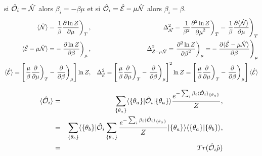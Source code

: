 	si $\hat{\mathbf{\mathcal{O}}}_i = \hat{\mathbf{\mathcal{N}}}$ alors $\beta_i = - \beta \mu $ et si $\hat{\mathbf{\mathcal{O}}}_i = \hat{\mathbf{\mathcal{E}}} - \mu \hat{\mathbf{\mathcal{N}}} $ alors $\beta_i = \beta$.\\
	
	\begin{eqnarray}
		\langle \hat{\mathbf{\mathcal{N}}} \rangle  = \left .\frac{1}{\beta} \frac{ \partial \ln Z}{\partial \mu } \right )_T,  & & \Delta^2_{\hat{\mathbf{\mathcal{N}}}} = \left . \frac{1}{\beta^2} \frac{ \partial^2 \ln Z}{{\partial \mu}^2 } \right )_T =  \left . \frac{1}{\beta} \frac{ \partial \langle \hat{\mathbf{\mathcal{N}}} \rangle}{\partial \mu } \right )_T\\
		\langle \hat{\mathbf{\mathcal{E}}} - \mu\hat{\mathbf{\mathcal{N}}}  \rangle  = -\left . \frac{ \partial \ln Z}{\partial \beta } \right )_\mu,  & & \Delta^2_{\hat{\mathbf{\mathcal{E}}} - \mu\hat{\mathbf{\mathcal{N}}}} = \left .  \frac{ \partial^2 \ln Z}{{\partial \beta}^2 } \right )_\mu =  -\left .  \frac{ \partial \langle \hat{\mathbf{\mathcal{E}}} - \mu\hat{\mathbf{\mathcal{N}}} \rangle}{\partial \beta } \right )_\mu	\\
		\langle \hat{\mathbf{\mathcal{E}}} \rangle  = \left [ \left .\frac{\mu}{\beta} \frac{ \partial}{\partial \mu } \right )_T -\left . \frac{ \partial }{\partial \beta } \right )_\mu  \right ]\ln Z,  & & \Delta^2_{\hat{\mathbf{\mathcal{E}}} } = \left [ \left .\frac{\mu}{\beta} \frac{ \partial}{\partial \mu } \right )_T -\left . \frac{ \partial }{\partial \beta } \right )_\mu  \right ]^2\ln Z=  \left [ \left .\frac{\mu}{\beta} \frac{ \partial}{\partial \mu } \right )_T -\left . \frac{ \partial }{\partial \beta } \right )_\mu  \right ]\langle \hat{\mathbf{\mathcal{E}}} \rangle	
	\end{eqnarray}

	
	\begin{eqnarray}
		\langle\hat{\mathbf{\mathcal{O}}}_i \rangle & = & 	\sum_{\{\theta_a \} } 	\langle \{\theta_a \}  \vert \hat{\mathbf{\mathcal{O}}}_i \vert \{\theta_a \}  \rangle \frac{e^{-\sum_i \beta_i \langle \hat{\mathbf{\mathcal{O}}}_i \rangle_{\{\theta_a \}} }}{Z},\\
		& = & 	\sum_{\{\theta_b \}} \langle \{\theta_b \}  \vert  \hat{\mathbf{\mathcal{O}}}_i \sum_{\{\theta_a \}}\frac{e^{-\sum_i \beta_i \langle \hat{\mathbf{\mathcal{O}}}_i \rangle_{\{\theta_a \} } }}{Z} \vert \{\theta_a \}  \rangle  	\langle \{\theta_a \}  \vert  \{\theta_b \}  \rangle ,\\
		& = & Tr (  \hat{\mathbf{\mathcal{O}}}_i \hat{\mathbf{\rho}}) 
	\end{eqnarray}
	
